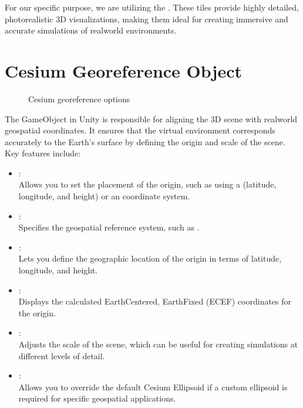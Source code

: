 \documentclass[letterpaper,10pt,english]{jupyterBook}
\begin{document}
\sphinxAtStartPar
For our specific purpose, we are utilizing the . These tiles provide highly detailed, photorealistic 3D visualizations, making them ideal for creating immersive and accurate simulations of real\sphinxhyphen{}world environments.


\section{Cesium Georeference Object}
\label{\detokenize{Cesium:cesium-georeference-object}}
\begin{figure}[htbp]
\centering
\capstart

\noindent{}
\caption{Cesium georeference options}\label{\detokenize{Cesium:cesium-georeference}}\end{figure}

\sphinxAtStartPar
The  GameObject in Unity is responsible for aligning the 3D scene with real\sphinxhyphen{}world geospatial coordinates. It ensures that the virtual environment corresponds accurately to the Earth’s surface by defining the origin and scale of the scene. Key features include:
\begin{itemize}
\item {} 
\sphinxAtStartPar
{}:\\
Allows you to set the placement of the origin, such as using a  (latitude, longitude, and height) or an  coordinate system.

\item {} 
\sphinxAtStartPar
{}:\\
Specifies the geospatial reference system, such as .

\item {} 
\sphinxAtStartPar
{}:\\
Lets you define the geographic location of the origin in terms of latitude, longitude, and height.

\item {} 
\sphinxAtStartPar
{}:\\
Displays the calculated Earth\sphinxhyphen{}Centered, Earth\sphinxhyphen{}Fixed (ECEF) coordinates for the origin.

\item {} 
\sphinxAtStartPar
{}:\\
Adjusts the scale of the scene, which can be useful for creating simulations at different levels of detail.

\item {} 
\sphinxAtStartPar
{}:\\
Allows you to override the default Cesium Ellipsoid if a custom ellipsoid is required for specific geospatial applications.

\end{itemize}
\end{document}
